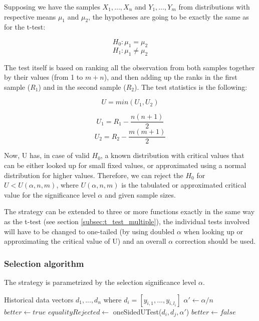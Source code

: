 Supposing we have the samples $X_1, \dots, X_n$ and $Y_1, \dots, Y_m$ from distributions with respective means $\mu_1$ and $\mu_2$, the hypotheses are going to be exactly the same as for the t-test:

\[
H_0: \mu_1 = \mu_2
\]
\[
H_1: \mu_1 \ne \mu_2
\]

The test itself is based on ranking all the observation from both samples together by their values (from 1 to $m+n$), and then adding up the ranks in the first sample ($R_1$) and in the second sample ($R_2$). The test statistics is the following:

\[U = min(U_1, U_2)\]

\[U_1 = R_1 - \frac{n(n+1)}{2}\]
\[U_2 = R_2 - \frac{m(m+1)}{2}\]

Now, U has, in case of valid $H_0$, a known distribution with critical values that can be either looked up for small fixed values, or approximated using a normal distribution for higher values. Therefore, we can reject the $H_0$ for $U < U(\alpha, n, m)$, where $U(\alpha, n, m)$ is the tabulated or approximated critical value for the significance level $\alpha$ and given sample sizes.

The strategy can be extended to three or more functions exactly in the same way as the t-test (see section \ref{subsec:t_test_multiple}), the individual tests involved will have to be changed to one-tailed (by using doubled $\alpha$ when looking up or approximating the critical value of U) and an overall $\alpha$ correction should be used.

\subsubsection{Selection algorithm}


The strategy is parametrized by the selection significance level $\alpha$.

\begin{algorithmic}[1] %
	\INPUT Historical data vectors $d_1,...,d_n$ where $d_i = [y_{i,1},...,y_{i,l_i}]$
	\State$\alpha' \gets \alpha / n$
	\State $better \gets true$
	\State $equalityRejected \gets$ oneSidedUTest($d_i, d_j, \alpha'$)
	\State $better \gets false$
	\EndIf
	\EndFor
	\State {}
	\EndIf
	\EndFor
	\State {}
	
\end{algorithmic}

